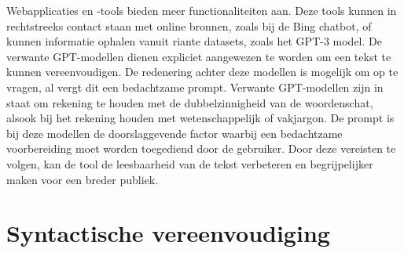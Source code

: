 Webapplicaties en -tools bieden meer functionaliteiten aan. Deze tools kunnen in rechtstreeks contact staan met online bronnen, zoals bij de Bing chatbot, of kunnen informatie ophalen vanuit riante datasets, zoals het GPT-3 model. De verwante GPT-modellen dienen expliciet aangewezen te worden om een tekst te kunnen vereenvoudigen. De redenering achter deze modellen is mogelijk om op te vragen, al vergt dit een bedachtzame prompt. Verwante GPT-modellen zijn in staat om rekening te houden met de dubbelzinnigheid van de woordenschat, alsook bij het rekening houden met wetenschappelijk of vakjargon. De prompt is bij deze modellen de doorslaggevende factor waarbij een bedachtzame voorbereiding moet worden toegediend door de gebruiker. Door deze vereisten te volgen, kan de tool de leesbaarheid van de tekst verbeteren en begrijpelijker maken voor een breder publiek.

\begin{table}[H]
	\centering
\end{table}


\section{Syntactische vereenvoudiging}

